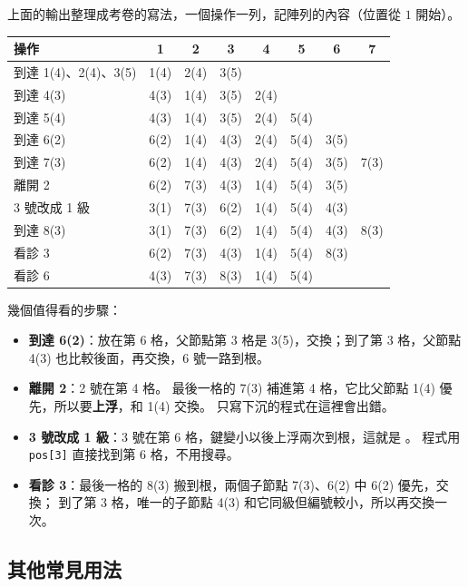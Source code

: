上面的輸出整理成考卷的寫法，一個操作一列，記陣列的內容（位置從 $1$ 開始）。

\begin{center}
\begin{tabular}{l*{7}{c}}
\toprule
操作 & 1 & 2 & 3 & 4 & 5 & 6 & 7 \\
\midrule
到達 1(4)、2(4)、3(5) & 1(4) & 2(4) & 3(5) \\
到達 4(3) & 4(3) & 1(4) & 3(5) & 2(4) \\
到達 5(4) & 4(3) & 1(4) & 3(5) & 2(4) & 5(4) \\
到達 6(2) & 6(2) & 1(4) & 4(3) & 2(4) & 5(4) & 3(5) \\
到達 7(3) & 6(2) & 1(4) & 4(3) & 2(4) & 5(4) & 3(5) & 7(3) \\
離開 2 & 6(2) & 7(3) & 4(3) & 1(4) & 5(4) & 3(5) \\
3 號改成 1 級 & 3(1) & 7(3) & 6(2) & 1(4) & 5(4) & 4(3) \\
到達 8(3) & 3(1) & 7(3) & 6(2) & 1(4) & 5(4) & 4(3) & 8(3) \\
看診 3 & 6(2) & 7(3) & 4(3) & 1(4) & 5(4) & 8(3) \\
看診 6 & 4(3) & 7(3) & 8(3) & 1(4) & 5(4) \\
\bottomrule
\end{tabular}
\end{center}

幾個值得看的步驟：

\begin{itemize}
\item \textbf{到達 6(2)}：放在第 6 格，父節點第 3 格是 3(5)，交換；到了第 3 格，父節點
4(3) 也比較後面，再交換，6 號一路到根。
\item \textbf{離開 2}：2 號在第 4 格。 最後一格的 7(3) 補進第 4 格，它比父節點 1(4) 優
先，所以要\textbf{上浮}，和 1(4) 交換。 只寫下沉的程式在這裡會出錯。
\item \textbf{3 號改成 1 級}：3 號在第 6 格，鍵變小以後上浮兩次到根，這就是
。 程式用 \texttt{pos[3]} 直接找到第 6 格，不用搜尋。
\item \textbf{看診 3}：最後一格的 8(3) 搬到根，兩個子節點 7(3)、6(2) 中 6(2) 優先，交換；
到了第 3 格，唯一的子節點 4(3) 和它同級但編號較小，所以再交換一次。
\end{itemize}

\subsection{其他常見用法}

